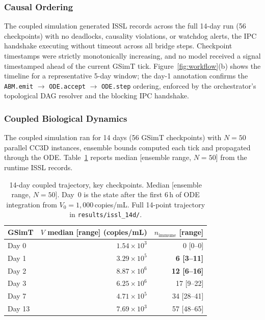 \documentclass[conference,letterpaper,10pt]{IEEEtran}
\begin{document}
\subsubsection{Causal Ordering}
The coupled simulation generated ISSL records across the full 14-day run
(56 checkpoints) with no deadlocks, causality violations, or watchdog
alerts, the IPC handshake executing without timeout across all bridge
steps. Checkpoint timestamps were strictly monotonically increasing, and
no model received a signal timestamped ahead of the current GSimT tick.
Figure~\ref{fig:workflow}(b) shows the timeline for a representative 5-day
window; the day-1 annotation confirms the \texttt{ABM.emit} $\to$
\texttt{ODE.accept} $\to$ \texttt{ODE.step} ordering, enforced by the
orchestrator's topological DAG resolver and the blocking IPC handshake.

\subsubsection{Coupled Biological Dynamics}\label{sec:valid-bio}

The coupled simulation ran for 14 days (56 GSimT checkpoints) with
$N\!=\!50$ parallel CC3D instances, ensemble bounds computed each tick and
propagated through the ODE. Table~\ref{tab:trajectory} reports median
[ensemble range, $N\!=\!50$] from the runtime ISSL records.

\begin{table}[t]
\centering
\caption{14-day coupled trajectory, key checkpoints. Median [ensemble
range, $N\!=\!50$]. Day~0 is the state after the first 6\,h of ODE
integration from $V_0\!=\!1{,}000$\,copies/mL. Full 14-point trajectory
in \texttt{results/issl\_14d/}.}
\label{tab:trajectory}
\renewcommand{\arraystretch}{1.0}
\footnotesize
\begin{tabular}{lrr}
\toprule
\textbf{GSimT} & \textbf{$V$ median [range]} (copies/mL) & \textbf{$n_{\text{immune}}$} [range]\\
\midrule
Day 0  & $1.54{\times}10^{3}$ & 0 [0--0]\\
Day 1  & $3.29{\times}10^{5}$ & \textbf{6 [3--11]}\\
Day 2  & $8.87{\times}10^{6}$ & \textbf{12 [6--16]}\\
Day 3  & $6.25{\times}10^{6}$ & 17 [9--22]\\
Day 7  & $4.71{\times}10^{5}$ & 34 [28--41]\\
Day 13 & $7.69{\times}10^{3}$ & 57 [48--65]\\
\bottomrule
\end{tabular}
\end{table}
\end{document}
